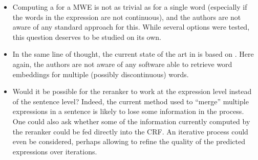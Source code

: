 \documentclass[output=paper,modfonts,nonflat]{langsci/langscibook}
\begin{document}
\begin{itemize}
\item Computing a  for a MWE is not as trivial as for a
  single word (especially if the words in the expression are not
  continuous), and the authors are not aware of any standard approach
  for this. While several options were tested, this question deserves
  to be studied on its own.
\item In the same line of thought, the current state of the art in
   is based on 
  \citep{legrand2016phrase}. Here again, the authors are not
  aware of any software able to retrieve word embeddings for multiple
  (possibly discontinuous) words.
\item Would it be possible for the reranker to work at the expression
  level instead of the sentence level? Indeed, the current method used
  to ``merge'' multiple expressions in a sentence is likely to lose
  some information in the process. One could also ask whether some of
  the information currently computed by the reranker could be fed directly
  into the CRF. An iterative process could even be considered, perhaps
  allowing to refine the quality of the predicted expressions over
  iterations.
\end{itemize}







\end{document}
